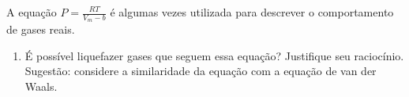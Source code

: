 \begin{xcs}
    A equação \( P = \frac{RT}{V_m - b} \) é algumas vezes utilizada para
    descrever o comportamento de gases reais. 
    \begin{enumerate}[label=\alph*.]
        \item É possível liquefazer gases que seguem essa equação? Justifique
            seu raciocínio. Sugestão: considere a similaridade da equação com a
            equação de van der Waals. 
    \end{enumerate}
\end{xcs}
\begin{rsl}
    
\end{rsl}
